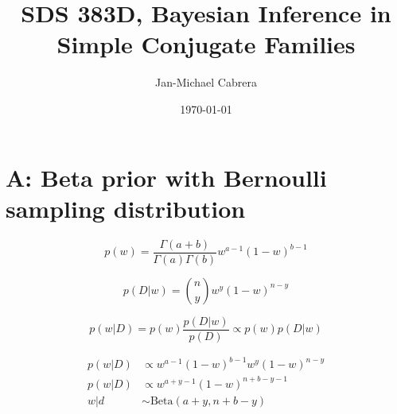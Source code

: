 \documentclass[12pt]{article}
\begin{document}
    \title{SDS 383D, Bayesian Inference in Simple Conjugate Families}
    \author{Jan-Michael Cabrera}
    \date{\today}
    \maketitle

    \section*{A: Beta prior with Bernoulli sampling distribution}

        \begin{equation}
              p(w) = \frac{\Gamma(a+b)}{\Gamma(a)\Gamma(b)}w^{a-1}(1-w)^{b-1}
        \end{equation}

        \begin{equation}
              p(D|w) = \binom{n}{y} w^y (1 - w)^{n-y}
        \end{equation}

        \begin{equation}
              p(w|D) = p(w) \frac{p(D|w)}{p(D)} \propto p(w) p(D|w)
        \end{equation}

        \begin{align}
              p(w|D) &\propto w^{a-1}(1-w)^{b-1}w^y(1-w)^{n-y} \\
              p(w|D) &\propto w^{a+y-1}(1-w)^{n+b-y-1} \\
              w|d &\sim \text{Beta}(a+y, n+b-y)
        \end{align}
\end{document}
